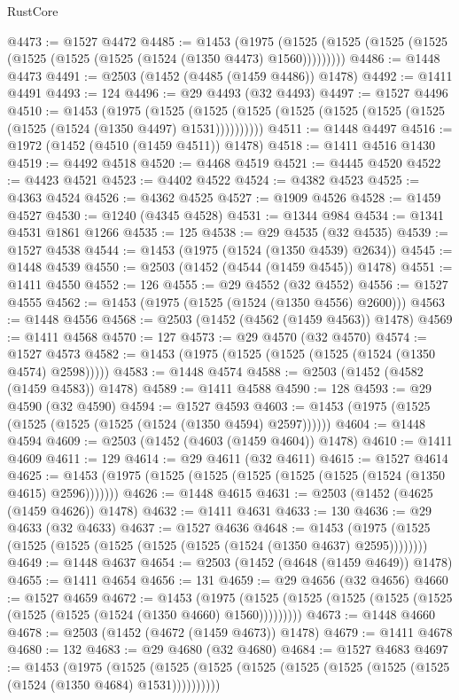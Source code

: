 \begin{lexlean}{RustCore}
\begin{coremodule}
@4473 := @1527 @4472
@4485 := @1453
    (@1975 (@1525 (@1525 (@1525 (@1525 (@1525 (@1525 (@1525 (@1524 (@1350 @4473) @1560)))))))))
@4486 := @1448 @4473
@4491 := @2503 (@1452 (@4485 (@1459 @4486)) @1478)
@4492 := @1411 @4491
@4493 := 124
@4496 := @29 @4493 (@32 @4493)
@4497 := @1527 @4496
@4510 := @1453
    (@1975
      (@1525 (@1525 (@1525 (@1525 (@1525 (@1525 (@1525 (@1525 (@1524 (@1350 @4497) @1531))))))))))
@4511 := @1448 @4497
@4516 := @1972 (@1452 (@4510 (@1459 @4511)) @1478)
@4518 := @1411 @4516 @1430
@4519 := @4492 @4518
@4520 := @4468 @4519
@4521 := @4445 @4520
@4522 := @4423 @4521
@4523 := @4402 @4522
@4524 := @4382 @4523
@4525 := @4363 @4524
@4526 := @4362 @4525
@4527 := @1909 @4526
@4528 := @1459 @4527
@4530 := @1240 (@4345 @4528)
@4531 := @1344 @984
@4534 := @1341 @4531 @1861 @1266
@4535 := 125
@4538 := @29 @4535 (@32 @4535)
@4539 := @1527 @4538
@4544 := @1453 (@1975 (@1524 (@1350 @4539) @2634))
@4545 := @1448 @4539
@4550 := @2503 (@1452 (@4544 (@1459 @4545)) @1478)
@4551 := @1411 @4550
@4552 := 126
@4555 := @29 @4552 (@32 @4552)
@4556 := @1527 @4555
@4562 := @1453 (@1975 (@1525 (@1524 (@1350 @4556) @2600)))
@4563 := @1448 @4556
@4568 := @2503 (@1452 (@4562 (@1459 @4563)) @1478)
@4569 := @1411 @4568
@4570 := 127
@4573 := @29 @4570 (@32 @4570)
@4574 := @1527 @4573
@4582 := @1453 (@1975 (@1525 (@1525 (@1525 (@1524 (@1350 @4574) @2598)))))
@4583 := @1448 @4574
@4588 := @2503 (@1452 (@4582 (@1459 @4583)) @1478)
@4589 := @1411 @4588
@4590 := 128
@4593 := @29 @4590 (@32 @4590)
@4594 := @1527 @4593
@4603 := @1453 (@1975 (@1525 (@1525 (@1525 (@1525 (@1524 (@1350 @4594) @2597))))))
@4604 := @1448 @4594
@4609 := @2503 (@1452 (@4603 (@1459 @4604)) @1478)
@4610 := @1411 @4609
@4611 := 129
@4614 := @29 @4611 (@32 @4611)
@4615 := @1527 @4614
@4625 := @1453 (@1975 (@1525 (@1525 (@1525 (@1525 (@1525 (@1524 (@1350 @4615) @2596)))))))
@4626 := @1448 @4615
@4631 := @2503 (@1452 (@4625 (@1459 @4626)) @1478)
@4632 := @1411 @4631
@4633 := 130
@4636 := @29 @4633 (@32 @4633)
@4637 := @1527 @4636
@4648 := @1453 (@1975 (@1525 (@1525 (@1525 (@1525 (@1525 (@1525 (@1524 (@1350 @4637) @2595))))))))
@4649 := @1448 @4637
@4654 := @2503 (@1452 (@4648 (@1459 @4649)) @1478)
@4655 := @1411 @4654
@4656 := 131
@4659 := @29 @4656 (@32 @4656)
@4660 := @1527 @4659
@4672 := @1453
    (@1975 (@1525 (@1525 (@1525 (@1525 (@1525 (@1525 (@1525 (@1524 (@1350 @4660) @1560)))))))))
@4673 := @1448 @4660
@4678 := @2503 (@1452 (@4672 (@1459 @4673)) @1478)
@4679 := @1411 @4678
@4680 := 132
@4683 := @29 @4680 (@32 @4680)
@4684 := @1527 @4683
@4697 := @1453
    (@1975
      (@1525 (@1525 (@1525 (@1525 (@1525 (@1525 (@1525 (@1525 (@1524 (@1350 @4684) @1531))))))))))

\end{coremodule}
\end{lexlean}
